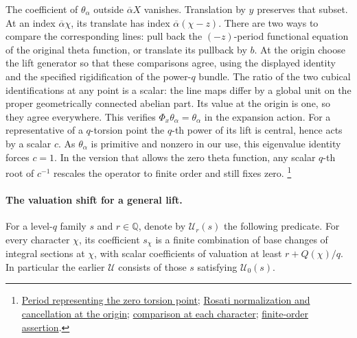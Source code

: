 The coefficient of \(\theta_\alpha\) outside
\(\overline\alpha X\) vanishes. Translation by \(y\) preserves
that subset. At an index \(\overline\alpha\chi\), its translate
has index \(\overline\alpha(\chi-z)\). There are two ways to compare
the corresponding lines: pull back the \((-z)\)-period functional
equation of the original theta function, or translate its pullback
by \(b\). At the origin choose the lift generator so that these
comparisons agree, using the displayed identity and the specified
rigidification of the power-\(q\) bundle. The ratio of the two
cubical identifications at any point is a scalar: the line maps
differ by a global unit on the proper geometrically connected
abelian part. Its value at the origin is one, so they agree
everywhere. This verifies
\(\Phi_x\theta_\alpha=\theta_\alpha\) in the expansion action.
For a representative of a \(q\)-torsion point the \(q\)-th power
of its lift is central, hence acts by a scalar \(c\). As
\(\theta_\alpha\) is primitive and nonzero in our use, this
eigenvalue identity forces \(c=1\). In the version that allows the
zero theta function, any scalar \(q\)-th root of \(c^{-1}\) rescales
the operator to finite order and still fixes zero.
\footnote{\href{https://github.com/ChristianKudeba/alpoge-rh-verification/blob/alpoge-source-7cbf7a0c/src/ReciprocityTheory/ReductiveGroups/ArithmeticGeometry/FirstCohomology/CanonicalLiftUnpacking.lean}{Period representing the zero torsion point};
\href{https://github.com/ChristianKudeba/alpoge-rh-verification/blob/alpoge-source-7cbf7a0c/src/ReciprocityTheory/ReductiveGroups/ArithmeticGeometry/FirstCohomology/CanonicalLiftOrigin.lean}{Rosati normalization and cancellation at the origin};
\href{https://github.com/ChristianKudeba/alpoge-rh-verification/blob/alpoge-source-7cbf7a0c/src/ReciprocityTheory/ReductiveGroups/ArithmeticGeometry/FirstCohomology/CanonicalLiftFrobenius.lean}{comparison at each character};
\href{https://github.com/ChristianKudeba/alpoge-rh-verification/blob/alpoge-source-7cbf7a0c/src/ReciprocityTheory/ReductiveGroups/ArithmeticGeometry/FirstCohomology/CanonLiftPf.lean}{finite-order assertion}.}

\paragraph{The valuation shift for a general lift.}
For a level-\(q\) family \(s\) and \(r\in\mathbb Q\), denote by
\(\mathcal U_r(s)\) the following predicate. For every character
\(\chi\), its coefficient \(s_\chi\) is a finite combination of
base changes of integral sections at \(\chi\), with scalar
coefficients of valuation at least \(r+Q(\chi)/q\).
In particular the earlier \(\mathcal U\) consists of those \(s\)
satisfying \(\mathcal U_0(s)\).

